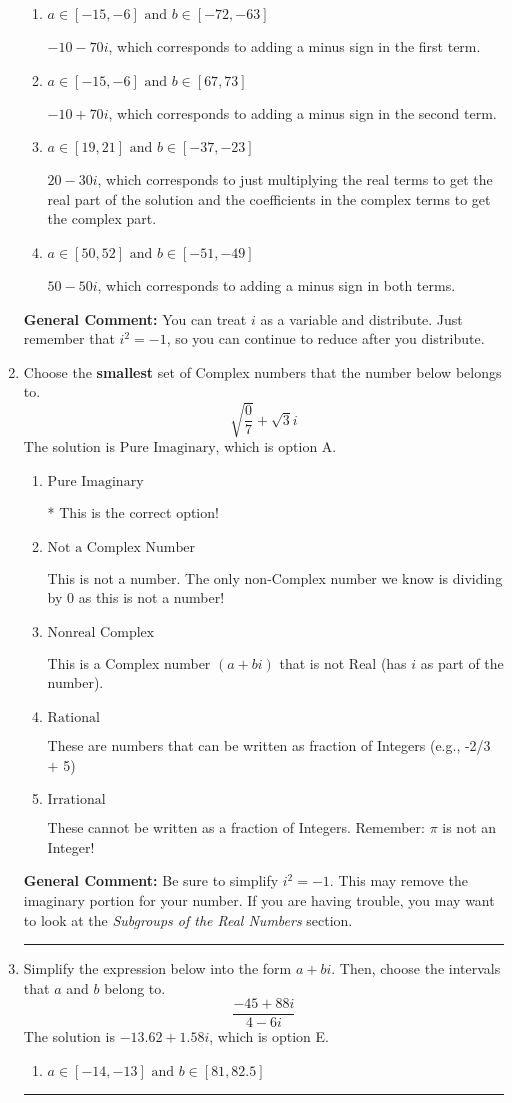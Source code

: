 \documentclass{extbook}[14pt]
\newcommand{\litem}[1]{\item #1

\rule{\textwidth}{0.4pt}}
\begin{document}
\begin{enumerate}
{\begin{enumerate}[label=\Alph*.]
* $50 + 50 i$, which is the correct option.
\item \( a \in [-15, -6] \text{ and } b \in [-72, -63] \)

 $-10 - 70 i$, which corresponds to adding a minus sign in the first term.
\item \( a \in [-15, -6] \text{ and } b \in [67, 73] \)

 $-10 + 70 i$, which corresponds to adding a minus sign in the second term.
\item \( a \in [19, 21] \text{ and } b \in [-37, -23] \)

 $20 - 30 i$, which corresponds to just multiplying the real terms to get the real part of the solution and the coefficients in the complex terms to get the complex part.
\item \( a \in [50, 52] \text{ and } b \in [-51, -49] \)

 $50 - 50 i$, which corresponds to adding a minus sign in both terms.
\end{enumerate}

\textbf{General Comment:} You can treat $i$ as a variable and distribute. Just remember that $i^2=-1$, so you can continue to reduce after you distribute.
}
\litem{
Choose the \textbf{smallest} set of Complex numbers that the number below belongs to.
\[ \sqrt{\frac{0}{7}}+\sqrt{3}i \]The solution is \( \text{Pure Imaginary} \), which is option A.\begin{enumerate}[label=\Alph*.]
\item \( \text{Pure Imaginary} \)

* This is the correct option!
\item \( \text{Not a Complex Number} \)

This is not a number. The only non-Complex number we know is dividing by 0 as this is not a number!
\item \( \text{Nonreal Complex} \)

This is a Complex number $(a+bi)$ that is not Real (has $i$ as part of the number).
\item \( \text{Rational} \)

These are numbers that can be written as fraction of Integers (e.g., -2/3 + 5)
\item \( \text{Irrational} \)

These cannot be written as a fraction of Integers. Remember: $\pi$ is not an Integer!
\end{enumerate}

\textbf{General Comment:} Be sure to simplify $i^2 = -1$. This may remove the imaginary portion for your number. If you are having trouble, you may want to look at the \textit{Subgroups of the Real Numbers} section.
}
\litem{
Simplify the expression below into the form $a+bi$. Then, choose the intervals that $a$ and $b$ belong to.
\[ \frac{-45 + 88 i}{4 - 6 i} \]The solution is \( -13.62  + 1.58 i \), which is option E.\begin{enumerate}[label=\Alph*.]
\item \( a \in [-14, -13] \text{ and } b \in [81, 82.5] \)


\end{enumerate}}
\end{enumerate}
\end{document}
